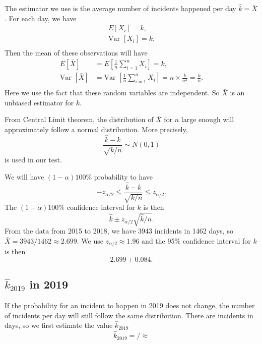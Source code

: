 \documentclass[11pt,a4paper,english]{article}
\begin{document}
The estimator we use is the average number of incidents happened per day $\hat{k} = \bar{X}$.
For each day, we have 
\begin{align*}
	E[X_{i}] = k,\\
	\text{Var }[X_{i}] = k.\\
\end{align*}
Then the mean of these observations will have 
\begin{align*}
	E[\bar{X}] &= E[\frac{1}{n}\sum_{i = 1}^{n}X_{i}] = k,\\
	\text{Var }[\bar{X}] &= \text{Var }[\frac{1}{n}\sum_{i = 1}^{n}X_{i}] = n \times \frac{k}{n^{2}} = \frac{k}{n}.\\
\end{align*}
Here we use the fact that these random variables are independent. So $\bar{X}$ is an unbiased estimator for $k$.

From Central Limit theorem, the distribution of $\bar{X}$ for $n$ large enough will approximately follow a normal distribution. More precisely,
\begin{equation*}
	\frac{\hat{k}-k}{\sqrt{k/n}} \sim N(0,1)
\end{equation*}
is used in our test. 

We will have $(1-\alpha)100\%$ probability to have 
\begin{equation*}
	-z_{\alpha/2} \leq \frac{\hat{k}-k}{\sqrt{k/n}} \leq z_{\alpha/2}.
\end{equation*}
The $(1-\alpha)100\%$ confidence interval for $k$ is then 
\begin{equation*}
	\hat{k} \pm z_{\alpha/2}\sqrt{\hat{k}/n}.
\end{equation*}
From the data from 2015 to 2018, we have 3943 incidents in 1462 days, so $\bar{X} = 3943/1462 \approx 2.699$. We use $z_{\alpha/2} \approx 1.96$ and the 95\% confidence interval for $k$ is then 
\begin{equation*}
	2.699 \pm 0.084.
\end{equation*}

\subsection{$\hat{k}_{2019}$ in 2019}
If the probability for an incident to happen in 2019 does not change, the number of incidents per day will still follow the same distribution. There are incidents in days, so we first estimate the value $\hat{k}_{2019}$
\begin{equation*}
	\hat{k}_{2019} = / \approx
\end{equation*}
\end{document}
